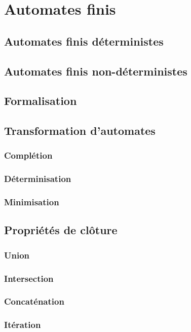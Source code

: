 \chapter{Automates finis}
\label{automates}

\section{Automates finis déterministes}

\section{Automates finis non-déterministes}

\section{Formalisation}

\section{Transformation d'automates}

\subsection{Complétion}

\subsection{Déterminisation}

\subsection{Minimisation}

\section{Propriétés de clôture}

\subsection{Union}

\subsection{Intersection}

\subsection{Concaténation}

\subsection{Itération}


